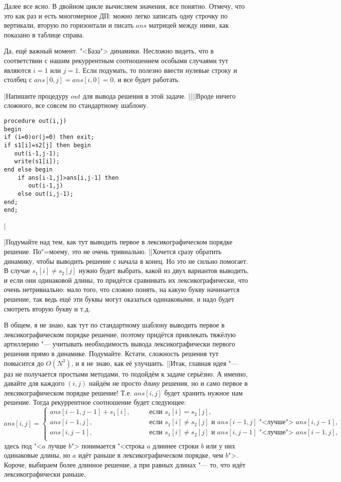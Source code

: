 Далее все ясно. В двойном цикле вычисляем значения, все понятно. Отмечу, что это как раз и есть 
многомерное ДП: можно легко записать одну строчку по вертикали, вторую по горизонтали и писать 
$ans$ матрицей между ними, как показано в таблице справа.

Да, ещё важный момент. "<База"> динамики. Несложно видеть, что в соответствии с нашим рекуррентным 
соотношением особыми случаями тут являются $i=1$ или $j=1$. Если подумать, то полезно ввести 
нулевые строку и столбец с $ans[0,j]=ans[i,0]=0$, и все будет работать.

\task|Напишите процедуру $out$ для вывода решения в этой задаче.
||||Вроде ничего сложного, все совсем по стандартному шаблону.
\begin{codesampleo}\begin{verbatim}
procedure out(i,j)
begin
if (i=0)or(j=0) then exit;
if s1[i]=s2[j] then begin
   out(i-1,j-1);
   write(s1[i]);
end else begin
    if ans[i-1,j]>ans[i,j-1] then
       out(i-1,j)
    else out(i,j-1);
end;
end;
\end{verbatim}
\end{codesampleo}
|

\task|Подумайте над тем, как тут выводить первое в лексикографическом порядке 
решение. По"=моему, это не очень тривиально.
||Хочется сразу обратить динамику, чтобы выводить решение с начала в конец. Но это не сильно 
помогает. В случае $s_1[i]\neq s_2[j]$ нужно будет выбрать, какой из двух вариантов выводить, и 
если они одинаковой длины, то придётся сравнивать их лексикографически, что очень нетривиально: 
мало того, что сложно понять, на какую букву начинается решение, так ведь ещё эти буквы могут 
оказаться одинаковыми, и надо будет смотреть вторую букву и т.д.

В общем, я не знаю, как тут по стандартному шаблону выводить первое в лексикографическом порядке 
решение, поэтому придётся привлекать тяжёлую артиллерию "--- учитывать необходимость вывода 
лексикографически первого решения прямо в динамике. Подумайте. Кстати, сложность решения тут 
повысится до $O(N^3)$, и я не знаю, как её улучшить.
||Итак, главная идея "--- раз не получается простыми методами, то подойдём к задаче серьёзно. А 
именно, давайте для каждого $(i,j)$ найдём не просто \textit{длину} решения, но и само первое в 
лексикографическом порядке решение! Т.е. $ans[i,j]$ будет хранить нужное нам решение. Тогда 
рекуррентное соотношение будет следующее:
$$
ans[i,j]=\left\{\begin{array}{ll}
ans[i-1,j-1]+s_1[i],\qquad&\mbox{если }s_1[i]=s_2[j],\\
ans[i-1,j],\qquad&\mbox{если $s_1[i]\neq s_2[j]$ и $ans[i-1,j]$ "<лучше"> $ans[i,j-1]$},\\
ans[i,j-1],\qquad&\mbox{если $s_1[i]\neq s_2[j]$ и $ans[i,j-1]$ "<лучше"> $ans[i-1,j]$},\\
\end{array}\right.
$$
здесь под "<$a$ лучше $b$"> понимается "<строка $a$ длиннее строки $b$ или у них одинаковые длины, 
но $a$ идёт раньше в лексикографическом порядке, чем $b$">. Короче, выбираем более длинное решение, 
а при равных длинах "--- то, что идёт лексикографически раньше.

